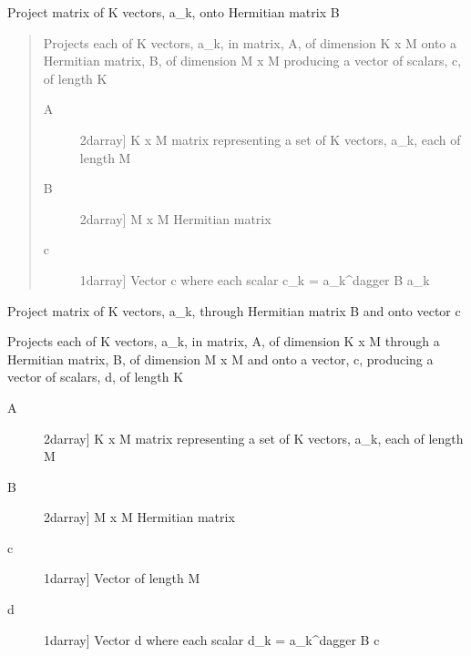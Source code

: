 \documentclass[letterpaper,10pt,english]{sphinxmanual}
\begin{document}
\begin{fulllineitems}
\label{\detokenize{infrapy.detection:infrapy.detection.beamforming_new.project_ABA}}
Project matrix of K vectors, a\_k, onto Hermitian matrix B
\begin{quote}

Projects each of K vectors, a\_k, in matrix, A, of dimension K x M
onto a Hermitian matrix, B, of dimension M x M producing a
vector of scalars, c, of length K
\begin{description}
\item[{A}] \leavevmode{[}2darray{]}
K x M matrix representing a set of K vectors, a\_k, each of length M

\item[{B}] \leavevmode{[}2darray{]}
M x M Hermitian matrix

\end{description}
\begin{description}
\item[{c}] \leavevmode{[}1darray{]}
Vector c where each scalar c\_k = a\_k\textasciicircum{}dagger B a\_k

\end{description}
\end{quote}

\end{fulllineitems}


\begin{fulllineitems}
\label{\detokenize{infrapy.detection:infrapy.detection.beamforming_new.project_ABc}}
Project matrix of K vectors, a\_k, through Hermitian matrix B and onto vector c

Projects each of K vectors, a\_k, in matrix, A, of dimension K x M
through a Hermitian matrix, B, of dimension M x M and onto a vector,
c, producing a vector of scalars, d, of length K
\begin{description}
\item[{A}] \leavevmode{[}2darray{]}
K x M matrix representing a set of K vectors, a\_k, each of length M

\item[{B}] \leavevmode{[}2darray{]}
M x M Hermitian matrix

\item[{c}] \leavevmode{[}1darray{]}
Vector of length M

\end{description}
\begin{description}
\item[{d}] \leavevmode{[}1darray{]}
Vector d where each scalar d\_k = a\_k\textasciicircum{}dagger B c

\end{description}

\end{fulllineitems}
\end{document}
